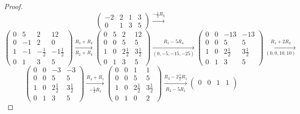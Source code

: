 \begin{enumerate}
\begin{proof}
\[\begin{pmatrix}
        -2 & 2   & 1 & 3  \\
        0  & 1   & 3 & 5
      \end{pmatrix} \xrightarrow{-\frac{1}{2}R_3}
    \]
    \[
      \begin{pmatrix}
        0 & 5   & 2            & 12            \\
        0 & - 1 & 2            & 0             \\
        1 & -1  & -\frac{1}{2} & -1\frac{1}{2} \\
        0 & 1   & 3            & 5
      \end{pmatrix} \xrightarrow[R_2 + R_4]{R_3 + R_4}
      \begin{pmatrix}
        0 & 5 & 2            & 12           \\
        0 & 0 & 5            & 5            \\
        1 & 0 & 2\frac{1}{2} & 3\frac{1}{2} \\
        0 & 1 & 3            & 5
      \end{pmatrix} \xrightarrow[(0,-5,-15,-25)]{R_1 - 5R_4}
      \begin{pmatrix}
        0 & 0 & -13          & -13          \\
        0 & 0 & 5            & 5            \\
        1 & 0 & 2\frac{1}{2} & 3\frac{1}{2} \\
        0 & 1 & 3            & 5
      \end{pmatrix} \xrightarrow[(0,0,10,10)]{R_1 + 2R_2}
    \]
    \[
      \begin{pmatrix}
        0 & 0 & -3           & -3           \\
        0 & 0 & 5            & 5            \\
        1 & 0 & 2\frac{1}{2} & 3\frac{1}{2} \\
        0 & 1 & 3            & 5
      \end{pmatrix} \xrightarrow[-\frac{1}{3}R_1]{R_4 + R_1}
      \begin{pmatrix}
        0 & 0 & 1            & 1            \\
        0 & 0 & 5            & 5            \\
        1 & 0 & 2\frac{1}{2} & 3\frac{1}{2} \\
        0 & 1 & 0            & 2
      \end{pmatrix} \xrightarrow[R_2 - 5R_1]{R_3 - 2\frac{1}{2}R_1}
      \begin{pmatrix}
        0 & 0 & 1 & 1 \\

\end{pmatrix}\]
\end{proof}
\end{enumerate}
